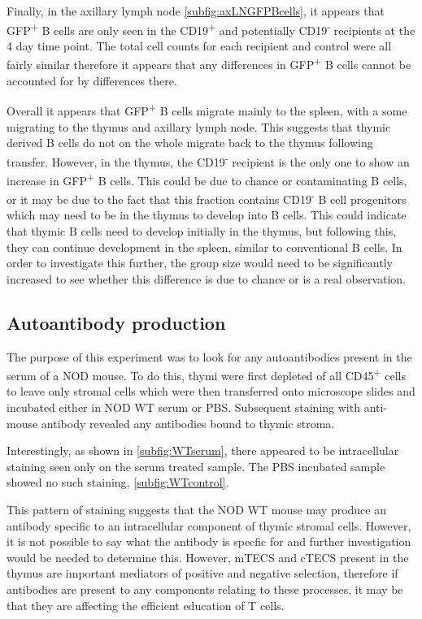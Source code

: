Finally, in the axillary lymph node \cref{subfig:axLNGFPBcells}, it appears that GFP\textsuperscript{+} B cells are only seen in the CD19\textsuperscript{+} and potentially CD19\textsuperscript{-} recipients at the 4 day time point.
The total cell counts for each recipient and control were all fairly similar therefore it appears that any differences in GFP\textsuperscript{+} B cells cannot be accounted for by differences there.

Overall it appears that GFP\textsuperscript{+} B cells migrate mainly to the spleen, with a some migrating to the thymus and axillary lymph node.
This suggests that thymic derived B cells do not on the whole migrate back to the thymus following transfer.
However, in the thymus, the CD19\textsuperscript{-} recipient is the only one to show an increase in GFP\textsuperscript{+} B cells. 
This could be due to chance or contaminating B cells, or it may be due to the fact that this fraction contains CD19\textsuperscript{-} B cell progenitors which may need to be in the thymus to develop into B cells.
This could indicate that thymic B cells need to develop initially in the thymus, but following this, they can continue development in the spleen, similar to conventional B cells.
In order to investigate this further, the group size would need to be significantly increased to see whether this difference is due to chance or is a real observation.



\subsection{Autoantibody production}

The purpose of this experiment was to look for any autoantibodies present in the serum of a NOD mouse.
To do this, thymi were first depleted of all CD45\textsuperscript{+} cells to leave only stromal cells which were then transferred onto microscope slides and incubated either in NOD WT serum or PBS.
Subsequent staining with anti-mouse antibody revealed any antibodies bound to thymic stroma.

Interestingly, as shown in \cref{subfig:WTserum}, there appeared to be intracellular staining seen only on the serum treated sample.
The PBS incubated sample showed no such staining, \cref{subfig:WTcontrol}.

This pattern of staining suggests that the NOD WT mouse may produce an antibody specific to an intracellular component of thymic stromal cells.
However, it is not possible to say what the antibody is specfic for and further investigation would be needed to determine this.
However, mTECS and cTECS present in the thymus are important mediators of positive and negative selection, therefore if antibodies are present to any components relating to these processes, it may be that they are affecting the efficient education of T cells.

